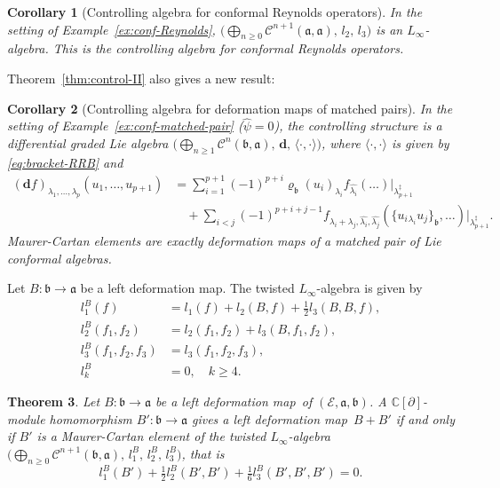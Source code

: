\documentclass[a4paper,11pt]{article}
\def\Rg{\mathbb{C}[\partial]}
\def\Ep{\mathcal{E}}
\def\Vs{\mathfrak{a}}
\def\Ws{\mathfrak{b}}
\def\rep{\varrho}
\def\shf{\widehat{\psi}}
\def\Cch{\mathscr{C}}
\def\la{\lambda}
\newcommand{\dM}{\mathbf{d}}
\numberwithin{equation}{section}
\newtheorem{theorem}{Theorem}[section]
\newtheorem{corollary}[theorem]{Corollary}
\begin{document}
\begin{corollary}[Controlling algebra for conformal Reynolds operators]
\label{cor:control-Reynolds}
In the setting of Example~\ref{ex:conf-Reynolds},
$\bigl(\bigoplus_{n\geq0}\Cch^{n+1}(\Vs,\Vs),\,l_2,\,l_3\bigr)$
is an $L_\infty$-algebra.  This is the \textit{controlling algebra for
conformal Reynolds operators}.
\end{corollary}
 
Theorem~\ref{thm:control-II} also gives a new result:
 
\begin{corollary}[Controlling algebra for deformation maps of matched pairs]
\label{cor:control-matched}
In the setting of Example~\ref{ex:conf-matched-pair} ($\shf=0$), the
controlling structure is a differential graded Lie algebra
$\bigl(\bigoplus_{n\geq1}\Cch^n(\Ws,\Vs),\,\dM,\,\langle\cdot,\cdot\rangle\bigr)$,
where $\langle\cdot,\cdot\rangle$ is given by \eqref{eq:bracket-RRB} and
\begin{equation}\label{eq:diff-matched}
\begin{split}
  (\dM f)_{\la_1,\ldots,\la_p}(u_1,\ldots,u_{p+1})
  &= \sum_{i=1}^{p+1}(-1)^{p+i}
     \rep_\Ws(u_i)_{\la_i}
     f_{\widehat{\la_i}}(\ldots)\big|_{\la_{p+1}^\ddag}\\
  &\quad + \sum_{i<j}(-1)^{p+i+j-1}
     f_{\la_i+\la_j,\widehat{\la_i},\widehat{\la_j}}
     (\{u_i{}_{\la_i}u_j\}_\Ws,\ldots)\big|_{\la_{p+1}^\ddag}.
\end{split}
\end{equation}
Maurer-Cartan elements are exactly deformation maps of a matched pair
of Lie conformal  algebras.
\end{corollary}
 
Let $B:\Ws\to\Vs$ be a left deformation map.  The twisted $L_\infty$-algebra is given by 
\begin{align}
  l_1^B(f)
  &= l_1(f) + l_2(B,f) + \tfrac{1}{2}l_3(B,B,f),
  \label{eq:l1B-II}\\
  l_2^B(f_1,f_2)
  &= l_2(f_1,f_2) + l_3(B,f_1,f_2),
  \label{eq:l2B-II}\\
  l_3^B(f_1,f_2,f_3)
  &= l_3(f_1,f_2,f_3),
  \label{eq:l3B-II}\\
  l_k^B &= 0, \quad k\geq4.
\end{align}
 
\begin{theorem}\label{thm:deform-DmapII}
Let $B:\Ws\to\Vs$ be a left deformation map\ of $(\Ep,\Vs,\Ws)$.  A $\Rg$-module
homomorphism $B':\Ws\to\Vs$ gives a left deformation map\ $B+B'$ if and only if $B'$
is a Maurer-Cartan element of the twisted $L_\infty$-algebra
$\bigl(\bigoplus_{n\geq0}\Cch^{n+1}(\Ws,\Vs),\,l_1^B,\,l_2^B,\,l_3^B\bigr)$, that is 
\begin{equation}\label{eq:MC-deform-II}
  l_1^B(B') + \tfrac{1}{2}l_2^B(B',B') + \tfrac{1}{6}l_3^B(B',B',B') = 0.
\end{equation}
\end{theorem}
 
\end{document}
